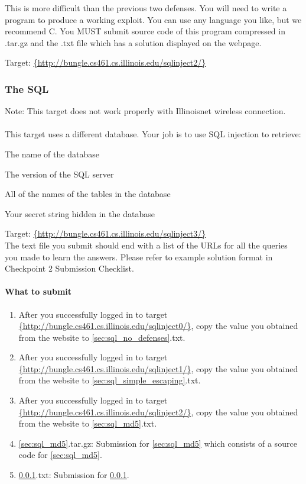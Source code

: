 \documentclass[letterpaper,12pt]{report}
\newcommand{\bungledomain}{http://bungle.cs461.cs.illinois.edu}
\begin{document}
This is more difficult than the previous two defenses.  You will need to write a program to produce a working exploit.  You can use any language you like, but we recommend C. You MUST submit source code of this program compressed in .tar.gz and the .txt file which has a solution displayed on the webpage.
\smallskip

Target: \url{{\bungledomain/sqlinject2/}}

\subsubsection{The SQL}
\label{sec:sql_secret}
Note: This target does not work properly with Illinoisnet wireless connection.\\\\
This target uses a different database.  Your job is to use SQL injection to retrieve:
\begin{compactenum}
\item The name of the database
\item The version of the SQL server
\item All of the names of the tables in the database
\item Your secret string hidden in the database
\end{compactenum}

Target: \url{{\bungledomain/sqlinject3/}}\\

The text file you submit should end with a list of the URLs for all the queries you made to learn the answers. Please refer to example solution format in Checkpoint 2 Submission Checklist.

\paragraph{What to submit} 
\begin{enumerate}
\item After you successfully logged in to target \url{{\bungledomain/sqlinject0/}}, copy the value you obtained from the website to {\ref{sec:sql_no_defenses}.txt}.
\item After you successfully logged in to target \url{{\bungledomain/sqlinject1/}}, copy the value you obtained from the website to {\ref{sec:sql_simple_escaping}.txt}.
\item After you successfully logged in to target \url{{\bungledomain/sqlinject2/}}, copy the value you obtained from the website to {\ref{sec:sql_md5}.txt}.
\item {\ref{sec:sql_md5}.tar.gz}: Submission for \ref{sec:sql_md5} which consists of a source code for \ref{sec:sql_md5}.
\item {\ref{sec:sql_secret}.txt}: Submission for \ref{sec:sql_secret}.
\end{enumerate}
\end{document}
